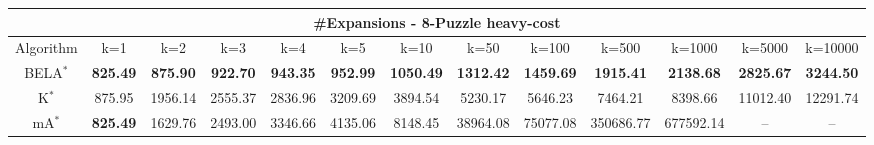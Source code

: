 \begin{tabular}{c|cccccccccccc}\toprule
\multicolumn{13}{c}{#Expansions - 8-Puzzle heavy-cost}\\ \midrule
Algorithm & k=1 & k=2 & k=3 & k=4 & k=5 & k=10 & k=50 & k=100 & k=500 & k=1000 & k=5000 & k=10000 \\ \midrule
BELA$^*$ & \textbf{825.49} & \textbf{875.90} & \textbf{922.70} & \textbf{943.35} & \textbf{952.99} & \textbf{1050.49} & \textbf{1312.42} & \textbf{1459.69} & \textbf{1915.41} & \textbf{2138.68} & \textbf{2825.67} & \textbf{3244.50} \\
K$^*$ & 875.95 & 1956.14 & 2555.37 & 2836.96 & 3209.69 & 3894.54 & 5230.17 & 5646.23 & 7464.21 & 8398.66 & 11012.40 & 12291.74 \\
mA$^*$ & \textbf{825.49} & 1629.76 & 2493.00 & 3346.66 & 4135.06 & 8148.45 & 38964.08 & 75077.08 & 350686.77 & 677592.14 & -- & -- \\ \bottomrule 
\end{tabular}
